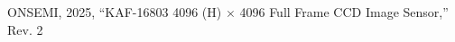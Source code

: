 \clearpage
\begin{thebibliography}{}
\raggedright

ONSEMI, 2025, “KAF-16803 4096 (H) $\times$ 4096  Full Frame CCD Image Sensor,” Rev. 2

\end{thebibliography}